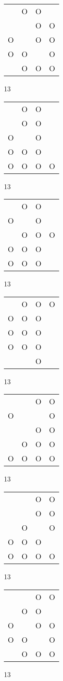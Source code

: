 \begin{tabular}{|m{0.2cm}m{0.2cm}m{0.2cm}m{0.2cm}|}\hline
 &O&O& \\
 & &O&O\\
O& &O&O\\
O&O& &O\\
 &O&O&O\\
\hline\end{tabular}13
\begin{tabular}{|m{0.2cm}m{0.2cm}m{0.2cm}m{0.2cm}|}\hline
 &O&O& \\
 &O&O& \\
O& &O& \\
O&O&O& \\
O&O&O&O\\
\hline\end{tabular}13
\begin{tabular}{|m{0.2cm}m{0.2cm}m{0.2cm}m{0.2cm}|}\hline
 &O&O& \\
O& &O& \\
 &O&O&O\\
O&O&O& \\
O&O&O& \\
\hline\end{tabular}13
\begin{tabular}{|m{0.2cm}m{0.2cm}m{0.2cm}m{0.2cm}|}\hline
 &O&O&O\\
O&O&O& \\
O&O&O& \\
O&O&O& \\
 & &O& \\
\hline\end{tabular}13
\begin{tabular}{|m{0.2cm}m{0.2cm}m{0.2cm}m{0.2cm}|}\hline
 & &O&O\\
O& & &O\\
 & &O&O\\
 &O&O&O\\
O&O&O&O\\
\hline\end{tabular}13
\begin{tabular}{|m{0.2cm}m{0.2cm}m{0.2cm}m{0.2cm}|}\hline
 & &O&O\\
 & &O&O\\
 &O& &O\\
O&O&O& \\
O&O&O&O\\
\hline\end{tabular}13
\begin{tabular}{|m{0.2cm}m{0.2cm}m{0.2cm}m{0.2cm}|}\hline
 & &O&O\\
 &O&O& \\
O& &O&O\\
O&O& &O\\
 &O&O&O\\
\hline\end{tabular}13
